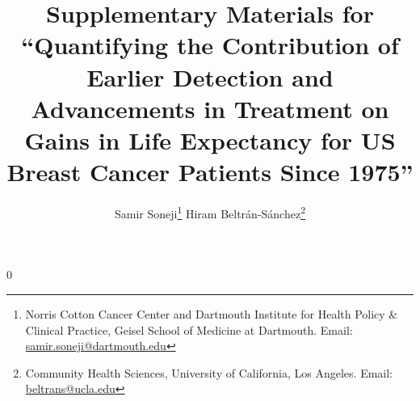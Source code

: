 \documentclass[11pt,letterpaper]{article}
\theoremstyle{plain}
\theoremstyle{remark}
\numberwithin{equation}{section}
\begin{document}
\newcommand\spacingset[1]{\renewcommand{\baselinestretch}%
{#1}\small\normalsize}
\spacingset{1}

\newcommand{\blind}{0} \newcommand{\tit}{Supplementary Materials for ``Quantifying the Contribution of Earlier Detection and Advancements in Treatment on Gains in Life Expectancy for US Breast Cancer Patients Since 1975''}

\blind

 {\title{\bf \tit}
 
  \author{Samir Soneji\thanks{Norris Cotton Cancer Center and
      Dartmouth Institute for Health Policy \& Clinical Practice,
      Geisel School of Medicine at Dartmouth. Email: \href{mailto:samir.soneji@dartmouth.edu}{samir.soneji@dartmouth.edu}}
  \quad \quad 
  Hiram Beltr\'{a}n-S\'{a}nchez\thanks{Community Health Sciences, University of California, Los Angeles. Email:
    \href{mailto:beltrans@ucla.edu}{beltrans@ucla.edu}}}

\date{ }

\maketitle} \fi



\end{document}
